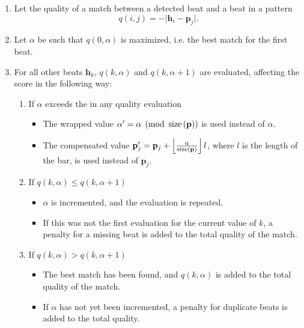 \begin{enumerate}
\item Let the quality of a match between a detected beat
and a beat in a pattern
\begin{equation}
q(i, j) = -\vert \mathbf{h}_i - \mathbf{p}_j \vert.
\end{equation}

\item Let $\alpha$ be such that $q(0, \alpha)$ is maximized,
i.e. the best match for the first beat.

\item For all other beats $\mathbf{h}_k$,
$q(k, \alpha)$ and $q(k, \alpha + 1)$ are evaluated,
affecting the score in the following way:
\begin{enumerate}
\item If $\alpha$ exceeds the  in any quality evaluation
\begin{itemize}
\item The wrapped value $\alpha' = \alpha \pmod {\operatorname{size} \left( \mathbf{p} \right)}$ is used instead of $\alpha$.
\item The compensated value
$\mathbf{p}_j' = \mathbf{p}_j +
\left \lfloor
\frac{\alpha}{\operatorname{size} \left( \mathbf{p} \right)}
\right \rfloor l$,
where $l$ is the length of the bar,
is used instead of $\mathbf{p}_j$.
\end{itemize}

\item If $q(k, \alpha) \leq q(k, \alpha + 1)$
\begin{itemize}
\item $\alpha$ is incremented, and the evaluation is repeated.
\item If this was not the first evaluation for the current value of $k$,
a penalty for a missing beat is added to the total quality of the match.
\end{itemize}

\item If $q(k, \alpha) > q(k, \alpha + 1)$
\begin{itemize}
\item The best match has been found,
and $q(k, \alpha)$ is added to the total quality of the match.
\item If $\alpha$ has not yet been incremented,
a penalty for duplicate beats is added to the total quality.
\end{itemize}
\end{enumerate}
\end{enumerate}

